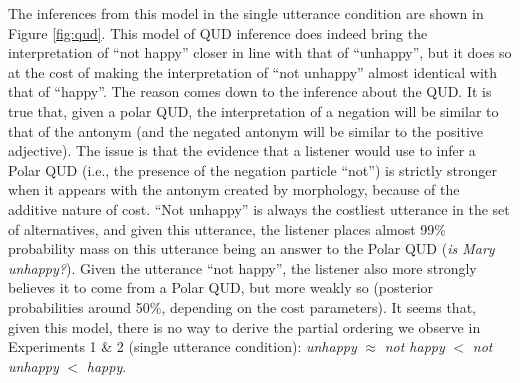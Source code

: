 \documentclass[floatsintext,doc]{apa6}
\begin{document}
The inferences from this model in the single utterance condition are shown in Figure \ref{fig:qud}. 
This model of QUD inference does indeed bring the interpretation of ``not happy'' closer in line with that of ``unhappy'', but it does so at the cost of making the interpretation of ``not unhappy'' almost identical with that of ``happy''. 
The reason comes down to the inference about the QUD. It is true that, given a polar QUD, the interpretation of a negation will be similar to that of the antonym (and the negated antonym will be similar to the positive adjective). 
The issue is that the evidence that a listener would use to infer a Polar QUD (i.e., the presence of the negation particle ``not'') is strictly stronger when it appears with the antonym created by morphology, because of the additive nature of cost. ``Not unhappy'' is always the costliest utterance in the set of alternatives, and given this utterance, the listener places almost 99\% probability mass on this utterance being an answer to the Polar QUD (\emph{is Mary unhappy?}). 
Given the utterance ``not happy'', the listener also more strongly believes it to come from a Polar QUD, but more weakly so (posterior probabilities around 50\%, depending on the cost parameters). It seems that, given this model, there is no way to derive the partial ordering we observe in Experiments 1 \& 2 (single utterance condition): \emph{unhappy} $\approx$ \emph{not happy} $<$ \emph{not unhappy} $<$ \emph{happy}. 

%
\end{document}
